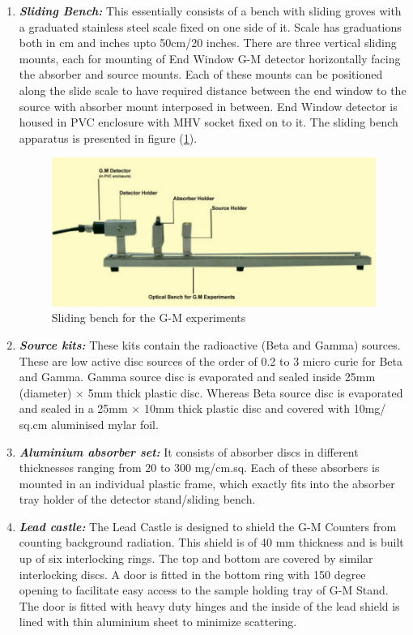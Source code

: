 \documentclass[%
 reprint,
nofootinbib,
 amsmath,amssymb,
 aps,
floatfix,
]{revtex4-2}
\begin{document}
\begin{enumerate}
        \item \textbf{\textit{Sliding Bench:}} This essentially consists of a bench with sliding groves with a graduated stainless steel scale fixed on one side of it. Scale has graduations both in cm and inches upto 50cm/20 inches. There are three vertical sliding mounts, each for mounting of End Window G-M detector horizontally facing the absorber and source mounts. Each of these mounts can be positioned along the slide scale to have required distance between the end window to the source with absorber mount interposed in between. End Window detector is housed in PVC enclosure with MHV socket fixed on to it. The sliding bench apparatus is presented in figure (\ref{fig:slidingbench}).
        \begin{figure}
            \centering
            \includegraphics[scale = 0.85]{Figures/slidingbench.png}
            \caption{Sliding bench for the G-M experiments}
            \label{fig:slidingbench}
        \end{figure}
        \item \textbf{\textit{Source kits:}} These kits contain the radioactive (Beta and Gamma) sources. These are low active disc sources of the order of 0.2 to 3 micro curie for Beta and Gamma. Gamma source disc is evaporated and sealed inside 25mm (diameter) $\times$ 5mm thick plastic disc. Whereas Beta source disc is evaporated and sealed in a 25mm $\times$ 10mm thick plastic disc and covered with 10mg/ sq.cm aluminised mylar foil.
        \item \textbf{\textit{Aluminium absorber set:}} It consists of absorber discs in different thicknesses ranging from 20 to 300 mg/cm.sq. Each of these absorbers is mounted in an individual plastic frame, which exactly fits into the absorber tray holder of the detector stand/sliding bench.
        \item \textbf{\textit{Lead castle:}} The Lead Castle is designed to shield the G-M Counters from counting background radiation. This shield is of 40 mm thickness and is built up of six interlocking rings. The top and bottom are covered by similar interlocking discs. A door is fitted in the bottom ring with 150 degree opening to facilitate easy access to the sample holding tray of G-M Stand. The door is fitted with heavy duty hinges and the inside of the lead shield is lined with thin aluminium sheet to minimize scattering.

\end{enumerate}
\end{document}

